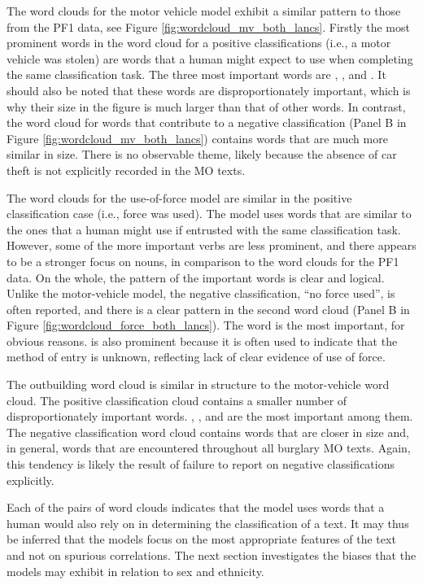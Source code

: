 The word clouds for the motor vehicle model exhibit a similar pattern to those from the PF1 data, see Figure \ref{fig:wordcloud_mv_both_lancs}. Firstly the most prominent words in the word cloud for a positive classifications (i.e., a motor vehicle was stolen) are words that a human might expect to use when completing the same classification task. The three most important words are , , and . It should also be noted that these words are disproportionately important, which is why their size in the figure is much larger than that of other words. In contrast, the word cloud for words that contribute to a negative classification (Panel B in Figure \ref{fig:wordcloud_mv_both_lancs}) contains words that are much more similar in size. There is no observable theme, likely because the absence of car theft is not explicitly recorded in the MO texts.


The word clouds for the use-of-force model are similar in the positive classification case (i.e., force was used). The model uses words that are similar to the ones that a human might use if entrusted with the same classification task. However, some of the more important verbs are less prominent, and there appears to be a stronger focus on nouns, in comparison to the word clouds for the PF1 data. On the whole, the pattern of the important words is clear and logical. Unlike the motor-vehicle model, the negative classification, “no force used”, is often reported, and there is a clear pattern in the second word cloud (Panel B in Figure \ref{fig:wordcloud_force_both_lancs}).  The word  is the most important, for obvious reasons.  is also prominent because it is often used to indicate that the method of entry is unknown, reflecting lack of clear evidence of use of force. 

The outbuilding word cloud is similar in structure to the motor-vehicle word cloud. The positive classification cloud contains a smaller number of disproportionately important words. , , and  are the most important among them. The negative classification word cloud contains words that are closer in size and, in general, words that are encountered throughout all burglary MO texts. Again, this tendency is likely the result of failure to report on negative classifications explicitly.

Each of the pairs of word clouds indicates that the model uses words that a human would also rely on in determining the classification of a text. It may thus be inferred that the models focus on the most appropriate features of the text and not on spurious correlations. The next section investigates the biases that the models may exhibit in relation to sex and ethnicity.

